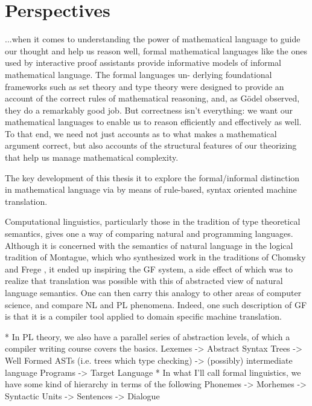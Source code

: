 \section{Perspectives}

\begin{displayquote}

...when it comes to understanding the power of mathematical language to guide our
thought and help us reason well, formal mathematical languages like the ones
used by interactive proof assistants provide informative models of informal
mathematical language. The formal languages un- derlying foundational frameworks
such as set theory and type theory were designed to provide an account of the
correct rules of mathematical reasoning, and, as Gödel observed, they do a
remarkably good job. But correctness isn’t everything: we want our mathematical
languages to enable us to reason efficiently and effectively as well. To that
end, we need not just accounts as to what makes a mathematical argument correct,
but also accounts of the structural features of our theorizing that help us
manage mathematical complexity.\cite{avigad2015mathematics}

\end{displayquote}

The key development of this thesis it to explore the formal/informal distinction
in mathematical language via by means of rule-based, syntax oriented machine
translation.

Computational linguistics, particularly those in the tradition of type
theoretical semantics\cite{ranta1994type}, gives one a way of comparing natural
and programming languages. Although it is concerned with the semantics of
natural language in the logical tradition of Montague, which who synthesized
work in the traditions of Chomsky \cite{Chomsky57} and Frege \cite{frege79}, it
ended up inspiring the GF system, a side effect of which was to realize that
translation was possible with this of abstracted view of natural language
semantics. One can then carry this analogy to other areas of computer science,
and compare NL and PL phenomena. Indeed, one such description of GF is that it
is a compiler tool applied to domain specific machine translation.

* In PL theory, we also have a parallel series of abstraction levels, of which a
compiler writing course covers the basics. Lexemes -> Abstract Syntax Trees ->
Well Formed ASTs (i.e. trees which type checking) -> (possibly) intermediate
language Programs -> Target Language * In what I'll call formal linguistics, we
have some kind of hierarchy in terms of the following Phonemes -> Morhemes ->
Syntactic Units -> Sentences -> Dialogue

